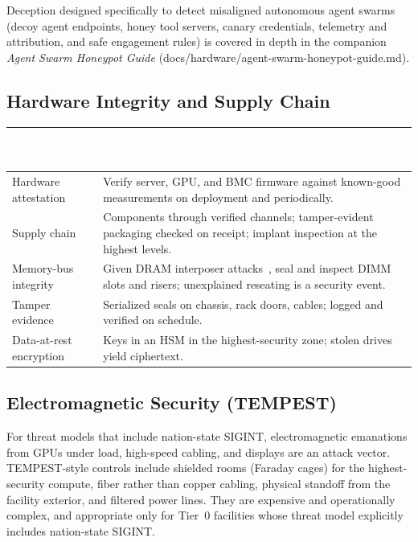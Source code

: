 \documentclass[11pt,letterpaper]{article}
\newcommand{\hrow}{\rowcolor{slategraphite}}
\newcommand{\hdr}[1]{\textcolor{white}{\bfseries\strut #1}}
\begin{document}
\begin{hardwarebox}
Deception designed specifically to detect misaligned autonomous agent swarms (decoy agent endpoints, honey tool servers, canary credentials, telemetry and attribution, and safe engagement rules) is covered in depth in the companion \emph{Agent Swarm Honeypot Guide} (docs/hardware/agent-swarm-honeypot-guide.md).
\end{hardwarebox}

\subsection{Hardware Integrity and Supply Chain}

\begin{longtable}{L{3.6cm} L{12.4cm}}
\hrow \hdr{Control} & \hdr{Description} \\
\endhead
Hardware attestation & Verify server, GPU, and BMC firmware against known-good measurements on deployment and periodically. \\
Supply chain & Components through verified channels; tamper-evident packaging checked on receipt; implant inspection at the highest levels. \\
Memory-bus integrity & Given DRAM interposer attacks~\cite{teefail,ddrop}, seal and inspect DIMM slots and risers; unexplained reseating is a security event. \\
Tamper evidence & Serialized seals on chassis, rack doors, cables; logged and verified on schedule. \\
Data-at-rest encryption & Keys in an HSM in the highest-security zone; stolen drives yield ciphertext. \\*
\bottomrule
\end{longtable}

\subsection{Electromagnetic Security (TEMPEST)}

For threat models that include nation-state SIGINT, electromagnetic emanations from GPUs under load, high-speed cabling, and displays are an attack vector. TEMPEST-style controls include shielded rooms (Faraday cages) for the highest-security compute, fiber rather than copper cabling, physical standoff from the facility exterior, and filtered power lines. They are expensive and operationally complex, and appropriate only for Tier~0 facilities whose threat model explicitly includes nation-state SIGINT.
\end{document}

